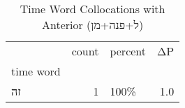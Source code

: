 \begin{table}[htbp!]
\centering
\caption{Time Word Collocations with Anterior (ל+פנה+מן)}
\label{table:antל+פנה+מן_head_cpd}
\begin{tabular}{lrlr}
\toprule
{} &  count & percent &   ΔP \\
time word &        &         &      \\
\midrule
זה        &      1 &    100\% &  1.0 \\
\bottomrule
\end{tabular}
\end{table}
